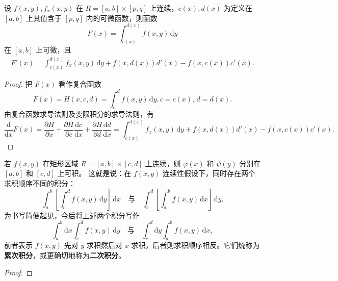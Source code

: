 \documentclass[../../main.tex]{subfiles}%
\begin{document}
\begin{theorem}[可微性]\label{theorem:含参量积分的可微性2}
设 \( f(x,y), f_x(x,y) \) 在 \( R = [a,b] \times [p,q] \) 上连续，\( c(x), d(x) \) 为定义在 \( [a,b] \) 上其值含于 \( [p,q] \) 内的可微函数，则函数
\[
F(x) = \int_{c(x)}^{d(x)} f(x,y) \, \mathrm{d}y
\]
在 \( [a,b] \) 上可微，且
\begin{align}
F'(x) = \int_{c(x)}^{d(x)} f_x(x,y) \, \mathrm{d}y + f(x,d(x)) d'(x) - f(x,c(x)) c'(x). \label{eq::-------6486-7}
\end{align}
\end{theorem} 
\begin{proof}
把 \( F(x) \) 看作复合函数
\[
F(x) = H(x,c,d) = \int_{c}^{d} f(x,y) \, \mathrm{d}y,
c = c(x), \, d = d(x).
\]
由复合函数求导法则及变限积分的求导法则，有
\[
\frac{\mathrm{d}}{\mathrm{d}x} F(x) = \frac{\partial H}{\partial x} + \frac{\partial H}{\partial c} \frac{\mathrm{d}c}{\mathrm{d}x} + \frac{\partial H}{\partial d} \frac{\mathrm{d}d}{\mathrm{d}x}
= \int_{c(x)}^{d(x)} f_x(x,y) \, \mathrm{d}y + f(x,d(x)) d'(x) - f(x,c(x)) c'(x).
\]
\end{proof}

\begin{theorem}[可积性]\label{theorem:含参量正常积分的可积性定理}
若 \( f(x,y) \) 在矩形区域 \( R = [a,b] \times [c,d] \) 上连续，则 \( \varphi(x) \) 和 \( \psi(y) \) 分别在 \( [a,b] \) 和 \( [c,d] \) 上可积。
这就是说：在 \( f(x,y) \) 连续性假设下，同时存在两个求积顺序不同的积分：
\[
\int_{a}^{b} \left[ \int_{c}^{d} f(x,y) \, \mathrm{d}y \right] \, \mathrm{d}x \quad \text{与} \quad \int_{c}^{d} \left[ \int_{a}^{b} f(x,y) \, \mathrm{d}x \right] \, \mathrm{d}y.
\]
为书写简便起见，今后将上述两个积分写作
\[
\int_{a}^{b} \mathrm{d}x \int_{c}^{d} f(x,y) \, \mathrm{d}y \quad \text{与} \quad \int_{c}^{d} \mathrm{d}y \int_{a}^{b} f(x,y) \, \mathrm{d}x,
\]
前者表示 \( f(x,y) \) 先对 \( y \) 求积然后对 \( x \) 求积，后者则求积顺序相反。它们统称为\textbf{累次积分}，或更确切地称为\textbf{二次积分}。
\end{theorem}
\begin{proof}

\end{proof}
\end{document}
